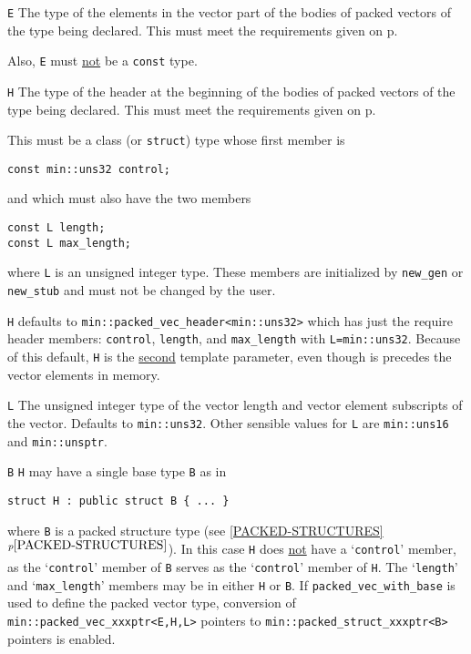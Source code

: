 \documentclass[12pt]{article}
\newcommand{\itemref}[1]{\ref{#1}$^{p\pageref{#1}}$}
\newcommand{\pagref}[1]{p\pageref{#1}}
\newcommand{\EOL}{\penalty \exhyphenpenalty}
\newcommand{\BRACKETED}[1]{{\tt <#1>}}
\newenvironment{indpar}[1][0.3in]%
	{\begin{list}{}%
		     {\setlength{\itemsep}{0in}%
		      \setlength{\topsep}{0in}%
		      \setlength{\parsep}{1ex}%
		      \setlength{\labelwidth}{#1}%
		      \setlength{\leftmargin}{#1}%
		      \addtolength{\leftmargin}{\labelsep}}%
	 \item}%
	{\end{list}}
\newenvironment{itemlist}[1][1.2in]%
	{\begin{list}{}{\setlength{\labelwidth}{#1}%
		        \setlength{\leftmargin}{\labelwidth}%
		        \addtolength{\leftmargin}{+0.2in}%
		        \renewcommand{\makelabel}[1]{##1\hfill}}}%
	{\end{list}}
\begin{document}
\begin{itemlist}[0.5in]

\item[{\tt E}]\label{PACKED_VEC_ELEMENT_TYPE}
The type of the elements in the vector part of the
bodies of packed vectors of the type being
declared.  This must meet the requirements given on
\pagref{PACKED-VECTOR-TYPE-REQUIREMENTS}.

Also, {\tt E} must \underline{not} be a {\tt const} type.

\item[{\tt H}]\label{PACKED_VEC_HEADER_TYPE}
The type of the header at the beginning of the
bodies of packed vectors of the type being
declared.  This must meet the requirements given on
\pagref{PACKED-VECTOR-TYPE-REQUIREMENTS}.

This must be a class (or \verb|struct|) type
whose first member is
\begin{indpar}
\verb|const min::uns32 control;|
\end{indpar}
and which must also have the two members
\begin{indpar}
\verb|const L length;| \\
\verb|const L max_length;|
\end{indpar}
where {\tt L} is an unsigned integer type.
These members are initialized by \verb|new_gen| or \verb|new_stub|
and must not
be changed by the user.

\verb|H| defaults to \verb|min::packed_vec_header<min::uns32>| which
has just the require header members: \verb|control|, \verb|length|, and
{\tt max\_\EOL length} with {\tt L=min::uns32}.  Because of this default,
\verb|H| is the \underline{second} template parameter,
even though is precedes the vector elements in memory.

\item[{\tt L}]
The unsigned integer type of the vector length and vector element subscripts
of the vector.  Defaults to {\tt min::\EOL uns32}.
Other sensible values for {\tt L} are
{\tt min::\EOL uns16} and {\tt min::\EOL unsptr}.

\item[{\tt B}]
{\tt H} may have a single base type {\tt B} as in
\begin{indpar}\begin{verbatim}
struct H : public struct B { ... }
\end{verbatim}\end{indpar}
where {\tt B} is a packed structure type (see \itemref{PACKED-STRUCTURES}).
In this case {\tt H} does
\underline{not} have a `{\tt control}' member, as
the `{\tt control}' member of {\tt B} serves as
the `{\tt control}' member of {\tt H}.  The `{\tt length}' and
`{\tt max\_length}' members may be in either {\tt H} or {\tt B}.
If {\tt packed\_\EOL vec\_\EOL with\_\EOL base\BRACKETED{E,H,B,L}}
is used to define the packed vector type, conversion of
{\tt min::\EOL packed\_\EOL vec\_\EOL xxxptr<E,H,L>} pointers
to {\tt min::\EOL packed\_\EOL struct\_\EOL xxxptr<B>}
pointers is enabled.

\end{itemlist}
\end{document}
